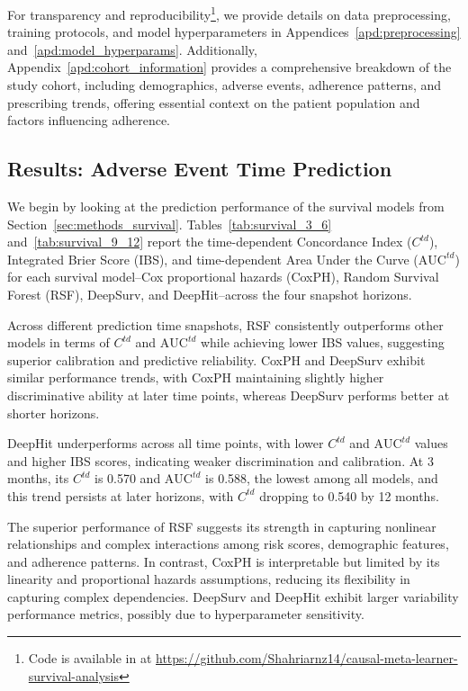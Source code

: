 For transparency and reproducibility\footnote{Code is available in at \url{https://github.com/Shahriarnz14/causal-meta-learner-survival-analysis}}, we provide details on data preprocessing, training protocols, and model hyperparameters in Appendices~\ref{apd:preprocessing} and~\ref{apd:model_hyperparams}.
Additionally, Appendix~\ref{apd:cohort_information} provides a comprehensive breakdown of the study cohort, including demographics, adverse events, adherence patterns, and prescribing trends, offering essential context on the patient population and factors influencing adherence. 

\subsection{Results: Adverse Event Time Prediction}
\label{sec:04_results_survival}

We begin by looking at the prediction performance of the survival models from Section~\ref{sec:methods_survival}.
Tables~\ref{tab:survival_3_6} and~\ref{tab:survival_9_12} report the time-dependent Concordance Index (\(C^{td}\)), Integrated Brier Score (IBS), and time-dependent Area Under the Curve (\(\text{AUC}^{td}\)) for each survival model--Cox proportional hazards (CoxPH), Random Survival Forest (RSF), DeepSurv, and DeepHit--across the four snapshot horizons. 

Across different prediction time snapshots, RSF consistently outperforms other models in terms of \(C^{td}\) and \(\text{AUC}^{td}\) while achieving lower IBS values, suggesting superior calibration and predictive reliability.
CoxPH and DeepSurv exhibit similar performance trends, with CoxPH maintaining slightly higher discriminative ability at later time points, whereas DeepSurv performs better at shorter horizons.

DeepHit underperforms across all time points, with lower \(C^{td}\) and \(\text{AUC}^{td}\) values and higher IBS scores, indicating weaker discrimination and calibration.
At 3 months, its \(C^{td}\) is 0.570 and \(\text{AUC}^{td}\) is 0.588, the lowest among all models, and this trend persists at later horizons, with \(C^{td}\) dropping to 0.540 by 12 months.

The superior performance of RSF suggests its strength in capturing nonlinear relationships and complex interactions among risk scores, demographic features, and adherence patterns.
In contrast, CoxPH is interpretable but limited by its linearity and proportional hazards assumptions, reducing its flexibility in capturing complex dependencies.
DeepSurv and DeepHit exhibit larger variability performance metrics, possibly due to hyperparameter sensitivity.

